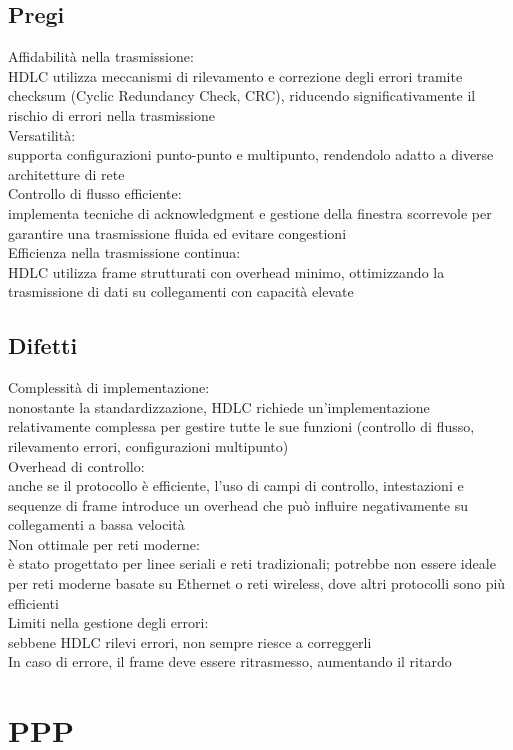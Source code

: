 \documentclass[10pt,oneside,a4paper]{article}
\begin{document}
\subsection{Pregi}
Affidabilità nella trasmissione:\\
HDLC utilizza meccanismi di rilevamento e correzione degli errori tramite checksum (Cyclic Redundancy Check, CRC), riducendo significativamente il rischio di errori nella trasmissione\\
Versatilità:\\
supporta configurazioni punto-punto e multipunto, rendendolo adatto a diverse architetture di rete\\
Controllo di flusso efficiente:\\
implementa tecniche di acknowledgment e gestione della finestra scorrevole per garantire una trasmissione fluida ed evitare congestioni\\
Efficienza nella trasmissione continua:\\
HDLC utilizza frame strutturati con overhead minimo, ottimizzando la trasmissione di dati su collegamenti con capacità elevate
\subsection{Difetti}
Complessità di implementazione:\\
nonostante la standardizzazione, HDLC richiede un'implementazione relativamente complessa per gestire tutte le sue funzioni (controllo di flusso, rilevamento errori, configurazioni multipunto)\\
Overhead di controllo:\\
anche se il protocollo è efficiente, l'uso di campi di controllo, intestazioni e sequenze di frame introduce un overhead che può influire negativamente su collegamenti a bassa velocità\\
Non ottimale per reti moderne:\\
è stato progettato per linee seriali e reti tradizionali; potrebbe non essere ideale per reti moderne basate su Ethernet o reti wireless, dove altri protocolli sono più efficienti\\
Limiti nella gestione degli errori:\\
sebbene HDLC rilevi errori, non sempre riesce a correggerli\\
In caso di errore, il frame deve essere ritrasmesso, aumentando il ritardo
\section{PPP}
\end{document}
